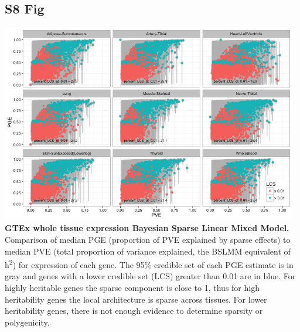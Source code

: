 \documentclass[10pt,letterpaper]{article}
\begin{document}
\begin{singlespace}
\subsection*{S8 Fig}
\includegraphics[width=13cm]{Figures/GenArch_Supp/S4Fig.png}
\label{S8_Fig}
{\bf GTEx whole tissue expression Bayesian Sparse Linear Mixed Model.} Comparison of median PGE (proportion of PVE explained by sparse effects) to median PVE (total proportion of variance explained, the BSLMM equivalent of h\textsuperscript{2}) for expression of each gene. The 95\% credible set of each PGE estimate is in gray and genes with a lower credible set (LCS) greater than 0.01 are in blue. For highly heritable genes the sparse component is close to 1, thus for high heritability genes the local architecture is sparse across tissues. For lower heritability genes, there is not enough evidence to determine sparsity or polygenicity. 


\end{singlespace}
\end{document}
